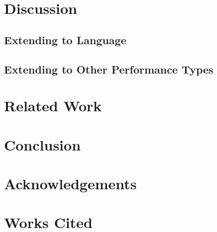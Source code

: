 \documentclass[twocolumn]{article}
\begin{document}
\section{Discussion}

\subsection{Extending to Language}

\subsection{Extending to Other Performance Types}

\section{Related Work}

\section{Conclusion}

\section{Acknowledgements}

\section{Works Cited}
\end{document}

